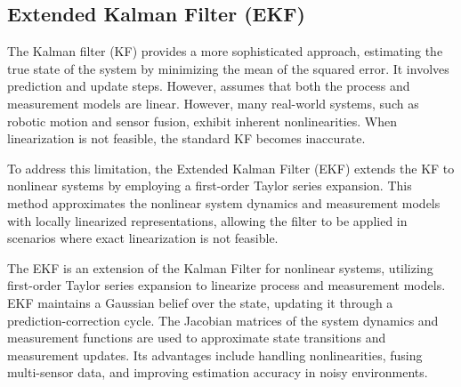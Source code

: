 
\subsection{Extended Kalman Filter (EKF)}
The Kalman filter (KF) provides a more sophisticated approach, estimating the true state of the system by minimizing the mean of the squared error. It involves prediction and update steps. However,  assumes that both the process and measurement models are linear. However, many real-world systems, such as robotic motion and sensor fusion, exhibit inherent nonlinearities. When linearization is not feasible, the standard KF becomes inaccurate. 

To address this limitation, the Extended Kalman Filter (EKF) extends the KF to nonlinear systems by employing a first-order Taylor series expansion. This method approximates the nonlinear system dynamics and measurement models with locally linearized representations, allowing the filter to be applied in scenarios where exact linearization is not feasible.

The EKF is an extension of the Kalman Filter for nonlinear systems, utilizing first-order Taylor series expansion to linearize process and measurement models. EKF maintains a Gaussian belief over the state, updating it through a prediction-correction cycle. The Jacobian matrices of the system dynamics and measurement functions are used to approximate state transitions and measurement updates. Its advantages include handling nonlinearities, fusing multi-sensor data, and improving estimation accuracy in noisy environments. 

